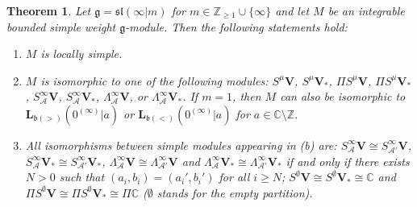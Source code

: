 \documentclass[12pt]{amsart}
\newcommand\C{\mathbb{C}}
\newcommand\Z{\mathbb{Z}}
\newcommand\g{\mathfrak{g}}
\newcommand\fb{\mathfrak{b}}
\newcommand\fsl{\mathfrak{sl}}
\newcommand\cA{\mathcal{A}}
\newcommand\bV{\mathbf{V}}
\newcommand\bL{\mathbf{L}}
\theoremstyle{plain}
\newtheorem{theo}{Theorem}[section]
\theoremstyle{definition}
\numberwithin{equation}{section}
\begin{document}
\begin{theo}\label{thm:classification.sl.case}
Let $\g = \fsl(\infty|m)$ for $m\in \Z_{\geq 1}\cup\{\infty\}$ and let $M$ be an integrable bounded simple weight $\g$-module. Then the following statements hold:
\begin{enumerate}
\item $M$ is locally simple.
\item $M$ is isomorphic to one of the following modules: $S^\mu \bV$, $S^\mu \bV_*$, $\Pi S^\mu \bV$, $\Pi S^\mu \bV_*$, $S_\cA^\infty \bV$, $S_\cA^\infty \bV_*$, $\Lambda_\cA^{\infty} \bV$, or $\Lambda_\cA^{\infty} \bV_*$. If $m=1$, then $M$ can also be isomorphic to $\bL_{\fb(>)}(0^{(\infty)}|a)$ or $\bL_{\fb(<)}(0^{(\infty)}|a)$ for $a\in \C\setminus \Z$.
\item All isomorphisms between simple modules appearing in (b) are: $S_\cA^\infty\bV\cong S_{\cA'}^\infty\bV$, $S_\cA^\infty\bV_*\cong S_{\cA'}^\infty\bV_*$, $\Lambda_\cA^\infty\bV\cong \Lambda_{\cA'}^\infty\bV$ and $\Lambda_\cA^\infty\bV_*\cong \Lambda_{\cA'}^\infty\bV_*$ if and only if there exists $N>0$ such that $(a_i, b_i)=(a_i', b_i')$ for all $i\geq N$; $S^\emptyset \bV\cong S^\emptyset \bV_*\cong \C$ and $\Pi S^\emptyset \bV\cong \Pi S^\emptyset \bV_*\cong \Pi \C$ ($\emptyset$ stands for the empty partition).
\end{enumerate}
\end{theo}
\end{document}
